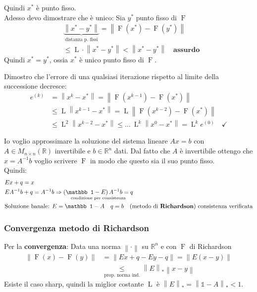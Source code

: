 \documentclass{article}
\begin{document}
Quindi $x^\ast$ è punto fisso.\\
Adesso devo dimostrare che è unico: Sia $y^\ast$ punto fisso di $\operatorname{F}$
\begin{align*}
     & \underbrace{\left\|x^\ast-y^\ast\right\|}_{\text{distanza p. fissi}}=\left\|\operatorname{F}(x^\ast)-\operatorname{F}(y^\ast)\right\| \\
     & \le\operatorname{L}\cdot\left\|x^\ast-y^\ast\right\|<\left\|x^\ast-y^\ast\right\|\quad\textbf{assurdo}
\end{align*}
Quindi $x^\ast=y^\ast$, ossia $x^\ast$ è unico punto fisso di $\operatorname{F}$.

Dimostro che l'errore di una qualsiasi iterazione rispetto al limite della successione decresce:
\begin{align*}
    e^{(k)} & =\left\|x^k-x^\ast\right\|=\left\|\operatorname{F}(x^{k-1})-\operatorname{F}(x^\ast)\right\|                                                             \\
            & \le\operatorname{L}\left\|x^{k-1}-x^\ast\right\|=\operatorname{L}\left\|\operatorname{F}\left(x^{k-2}\right)-\operatorname{F}\left(x^\ast\right)\right\| \\
            & \le\operatorname{L}^2\left\|x^{k-2}-x^\ast\right\|\le\dots\ \operatorname{L}^k\left\|x^0-x^\ast\right\|=\operatorname{L}^ke^{(0)}\quad\checkmark
\end{align*}

Io voglio approssimare la soluzione del sistema lineare $Ax=b$ con $A\in M_{n\times n}(\mathbb R)$ invertibile e $b\in\mathbb R^n$ dati.
Dal fatto che $A$ è invertibile ottengo che $x=A^{-1}b$ voglio scrivere $\operatorname{F}$ in modo che questo sia il suo punto fisso.\\
Quindi:
\begin{align*}
     & Ex+q=x                                                                                                        \\
     & EA^{-1}b+q=A^{-1}b\Rightarrow \underset{\text{condizione per consistenza}}{\left(\mathbb 1-E\right)A^{-1}b=q} \\
     & \text{Soluzione banale: $E=\mathbb 1-A\quad q=b\quad$(metodo di \textbf{Richardson}) consistenza verificata}
\end{align*}

\subsubsection{Convergenza metodo di Richardson}
Per la \textbf{convergenza}: Data una norma $\left\|\cdot\right\|$ su $\mathbb R^n$ e con $\operatorname{F}$ di Richardson
\begin{align*}
    \left\|\operatorname{F}(x)-\operatorname{F}(y)\right\| & =\left\|Ex+q-Ey-q\right\|=\left\|E(x-y)\right\|                                \\
                                                           & \underset{\text{prop. norma ind.}}{\le}\left\|E\right\|_\ast\left\|x-y\right\|
\end{align*}
Esiste il caso sharp, quindi la miglior costante $\operatorname{L}$ è $\left\|E\right\|_\ast=\left\|\mathbb 1-A\right\|_\ast<1$.
\end{document}
